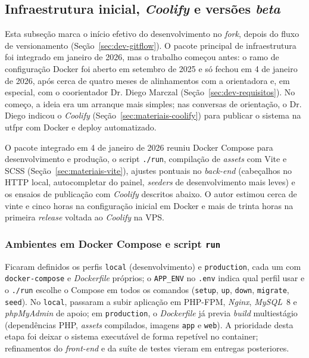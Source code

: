 \subsection{Infraestrutura inicial, \textit{Coolify} e versões \textit{beta}}\label{sec:dev-pr2-setup}

Esta subseção marca o início efetivo do desenvolvimento no \textit{fork}, depois do fluxo de versionamento (Seção~\ref{sec:dev-gitflow}). O pacote principal de infraestrutura foi integrado em janeiro de 2026, mas o trabalho começou antes: o ramo de configuração Docker foi aberto em setembro de 2025 e só fechou em 4 de janeiro de 2026, após cerca de quatro meses de alinhamentos com a orientadora e, em especial, com o coorientador Dr. Diego Marczal (Seção~\ref{sec:dev-requisitos}). No começo, a ideia era um arranque mais simples; nas conversas de orientação, o Dr. Diego indicou o \textit{Coolify} (Seção~\ref{sec:materiais-coolify}) para publicar o sistema na \acrshort{utfpr} com Docker e deploy automatizado.

O pacote integrado em 4 de janeiro de 2026 reuniu Docker Compose para desenvolvimento e produção, o script \texttt{./run}, compilação de \textit{assets} com Vite e SCSS (Seção~\ref{sec:materiais-vite}), ajustes pontuais no \textit{back-end} (cabeçalhos no HTTP local, autocompletar do painel, \textit{seeders} de desenvolvimento mais leves) e os ensaios de publicação com \textit{Coolify} descritos abaixo. O autor estimou cerca de vinte e cinco horas na configuração inicial em Docker e mais de trinta horas na primeira \textit{release} voltada ao \textit{Coolify} na VPS.

\subsubsection{Ambientes em Docker Compose e script \texttt{run}}

Ficaram definidos os perfis \texttt{local} (desenvolvimento) e \texttt{production}, cada um com \texttt{docker-compose} e \textit{Dockerfile} próprios; o \texttt{APP\_ENV} no \texttt{.env} indica qual perfil usar e o \texttt{./run} escolhe o Compose em todos os comandos (\texttt{setup}, \texttt{up}, \texttt{down}, \texttt{migrate}, \texttt{seed}). No \texttt{local}, passaram a subir aplicação em PHP-FPM, \textit{Nginx}, \textit{MySQL}~8 e \textit{phpMyAdmin} de apoio; em \texttt{production}, o \textit{Dockerfile} já previa \textit{build} multiestágio (dependências PHP, \textit{assets} compilados, imagens \texttt{app} e \texttt{web}). A prioridade desta etapa foi deixar o sistema executável de forma repetível no container; refinamentos do \textit{front-end} e da suíte de testes vieram em entregas posteriores.

